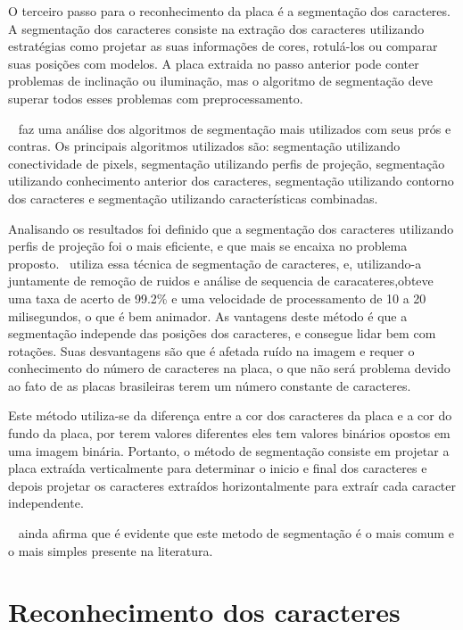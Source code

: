 O terceiro passo para o reconhecimento da placa é a segmentação dos caracteres. A segmentação dos caracteres 
consiste na extração dos caracteres utilizando estratégias como projetar as suas informações de cores, 
rotulá-los ou comparar suas posições com modelos. A placa extraida no passo anterior pode conter problemas 
de inclinação ou iluminação, mas o algoritmo de segmentação deve superar todos esses problemas com preprocessamento. ~\cite{s2013automatic}

~\cite{s2013automatic} faz uma análise dos algoritmos de segmentação mais utilizados com seus prós e contras. 
Os principais algoritmos utilizados são: segmentação utilizando conectividade de pixels, segmentação
utilizando perfis de projeção, segmentação utilizando conhecimento anterior dos caracteres, segmentação 
utilizando contorno dos caracteres e segmentação utilizando características combinadas.

Analisando os resultados foi definido que a segmentação dos caracteres utilizando perfis de projeção foi 
o mais eficiente, e que mais se encaixa no problema proposto.~\cite{sanyuan2004car} utiliza essa técnica 
de segmentação de caracteres, e, utilizando-a juntamente de remoção de ruidos e análise de sequencia de 
caracateres,obteve uma taxa de acerto de 99.2\% e uma velocidade de processamento de 10 a 20 milisegundos, 
o que é bem animador. As vantagens deste método é que a segmentação independe das posições dos caracteres, 
e consegue lidar bem com rotações. Suas desvantagens são que é afetada ruído na imagem e requer o conhecimento 
do número de caracteres na placa, o que não será problema devido ao fato de as placas brasileiras terem um 
número constante de caracteres.

Este método utiliza-se da diferença entre a cor dos caracteres da placa e a cor do fundo da placa, por 
terem valores diferentes eles tem valores binários opostos em uma imagem binária. Portanto, o método de 
segmentação consiste em projetar a placa extraída verticalmente para determinar o inicio e final dos 
caracteres e depois projetar os caracteres extraídos horizontalmente para extraír cada caracter independente.

~\cite{s2013automatic} ainda afirma que é evidente que este metodo de segmentação é o mais comum e o mais 
simples presente na literatura.

\section{Reconhecimento dos caracteres}
\label{sec:reconhecimento}

